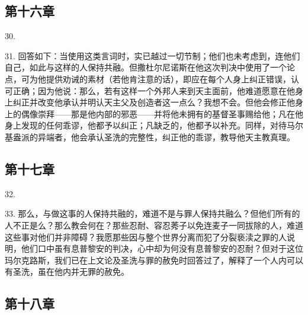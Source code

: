 \subsection{第十六章}

30. \par

31. 回答如下：当使用这类言词时，实已越过一切节制；他们也未考虑到，连他们自己，如此与这样的人保持共融。但撒杜尔尼诺斯在他这次判决中使用了一个论点，可为他提供劝诫的素材（若他肯注意的话），即应在每个人身上纠正错误，认可正确；因为他说：那么，若有这样一个外邦人来到天主面前，他难道愿意在他身上纠正并改变他承认并明认天主父及创造者这一点么？我想不会。但他会修正他身上的偶像崇拜——那是他内部的邪恶——并将他未拥有的基督圣事赐给他；凡在他身上发现的任何乖谬，他都予以纠正；凡缺乏的，他都予以补充。同样，对待马尔基盎派的异端者，他会承认圣洗的完整性，纠正他的乖谬，教导他天主教真理。\par


\subsection{第十七章}

32. \par

33. 那么，与做这事的人保持共融的，难道不是与罪人保持共融么？但他们所有的人不正是么？那么教会何在？那些忍耐、容忍莠子以免连麦子一同拔除的人，难道这些事对他们并非障碍？我愿那些因与整个世界分离而犯了分裂亵渎之罪的人说明，他们口中虽有息普黎安的判决，心中却为何没有息普黎安的忍耐？但对于这位玛尔克路斯，我们已在上文论及圣洗与罪的赦免时回答过了，解释了一个人内可以有圣洗，虽在他内并无罪的赦免。\par


\subsection{第十八章}

